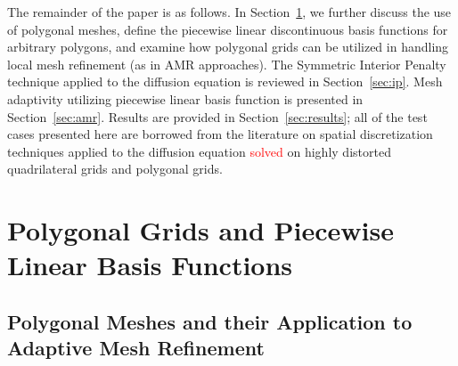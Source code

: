 \documentclass[preprint,10pt]{elsarticle}
\newcommand{\sct}[1]{Section~\ref{#1}}                   %
\newcommand{\tcr}[1]{\textcolor{red}{#1}}
\begin{document}

The remainder of the paper is as follows. In \sct{sec:poly}, we further discuss
the use of polygonal meshes, define the piecewise linear discontinuous 
basis functions for arbitrary polygons, and examine how polygonal grids
can be utilized in handling local mesh refinement (as in AMR 
approaches). The Symmetric Interior Penalty technique applied to the diffusion 
equation is reviewed in \sct{sec:ip}.
Mesh adaptivity utilizing piecewise linear basis function is presented in 
\sct{sec:amr}. Results are provided in \sct{sec:results}; all of the test cases presented here 
are borrowed from the literature on spatial discretization techniques applied to 
the diffusion equation \tcr{solved} on highly distorted quadrilateral grids and polygonal grids.

\section{Polygonal Grids and Piecewise Linear Basis Functions} \label{sec:poly}
\subsection{Polygonal Meshes and their Application to Adaptive Mesh Refinement}
\end{document}

